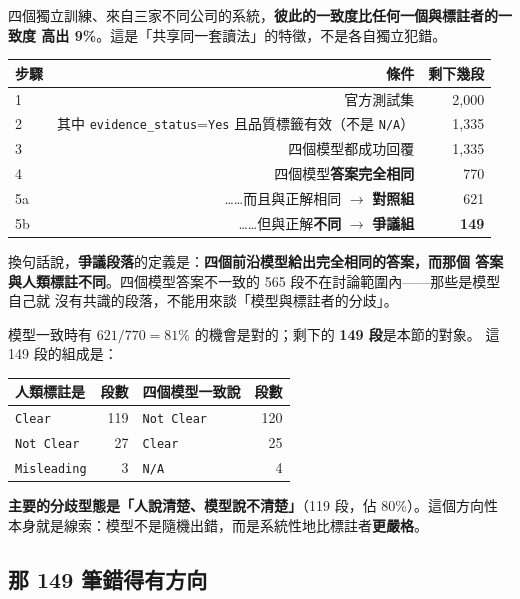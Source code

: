 \documentclass[11pt,a4paper]{ctexart}
\newcommand{\fn}[1]{\texttt{#1}}
\begin{document}
四個獨立訓練、來自三家不同公司的系統，\textbf{彼此的一致度比任何一個與標註者的一致度
高出 9\%}。這是「共享同一套讀法」的特徵，不是各自獨立犯錯。

\begin{table}[h]
\centering\small
\begin{tabular}{@{}lrr@{}}
\toprule
步驟 & 條件 & 剩下幾段 \\
\midrule
1 & 官方測試集 & 2{,}000 \\
2 & 其中 \fn{evidence\_status}=\fn{Yes} 且品質標籤有效（不是 \fn{N/A}） & 1{,}335 \\
3 & 四個模型都成功回覆 & 1{,}335 \\
4 & 四個模型\textbf{答案完全相同} & 770 \\
5a & \quad ……而且與正解相同 $\rightarrow$ \textbf{對照組} & 621 \\
\rowcolor{yellow!15}
5b & \quad ……但與正解\textbf{不同} $\rightarrow$ \textbf{爭議組} & \textbf{149} \\
\bottomrule
\end{tabular}
\end{table}

換句話說，\textbf{爭議段落}的定義是：\textbf{四個前沿模型給出完全相同的答案，而那個
答案與人類標註不同}。四個模型答案不一致的 565 段不在討論範圍內——那些是模型自己就
沒有共識的段落，不能用來談「模型與標註者的分歧」。

\medskip
模型一致時有 $621 / 770 = 81\%$ 的機會是對的；剩下的 \textbf{149 段}是本節的對象。
這 149 段的組成是：

\begin{table}[h]
\centering\small
\begin{tabular}{@{}lrlr@{}}
\toprule
人類標註是 & 段數 & 四個模型一致說 & 段數 \\
\midrule
\fn{Clear} & 119 & \fn{Not Clear} & 120 \\
\fn{Not Clear} & 27 & \fn{Clear} & 25 \\
\fn{Misleading} & 3 & \fn{N/A} & 4 \\
\bottomrule
\end{tabular}
\end{table}

\textbf{主要的分歧型態是「人說清楚、模型說不清楚」}（119 段，佔 80\%）。這個方向性
本身就是線索：模型不是隨機出錯，而是系統性地比標註者\textbf{更嚴格}。

\subsection{那 149 筆錯得有方向}
\end{document}
